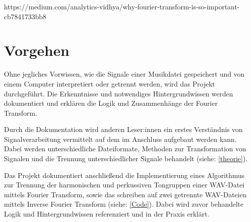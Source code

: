 \par

https://medium.com/analytics-vidhya/why-fourier-transform-is-so-important-cb7841733bb8


%
\section{Vorgehen}
%

Ohne jegliches Vorwissen, wie die Signale einer Musikdatei gespeichert und von einem Computer interpretiert oder getrennt werden, wird das Projekt durchgeführt. Die Erkenntnisse und notwendiges Hintergrundwissen werden dokumentiert und erklären die Logik und Zusammenhänge der Fourier Transform. 

\par

Durch die Dokumentation wird anderen Leser:innen ein erstes Verständnis von Signalverarbeitung vermittelt auf dem im Anschluss aufgebaut werden kann. Dabei werden unterschiedliche Dateiformate, Methoden zur Transformation von Signalen und die Trennung unterschiedlicher Signale behandelt (siehe: \cref{theorie}).

\par

Das Projekt dokumentiert anschließend die Implementierung eines Algorithmus zur Trennung der harmonischen und perkussiven Tongruppen einer WAV-Datei mittels Fourier Transform, sowie das schreiben auf zwei getrennte WAV-Dateien mittels Inverse Fourier Transform (siehe: \cref{Code}). Dabei wird zuvor behandelte Logik und Hintergrundwissen referenziert und in der Praxis erklärt.